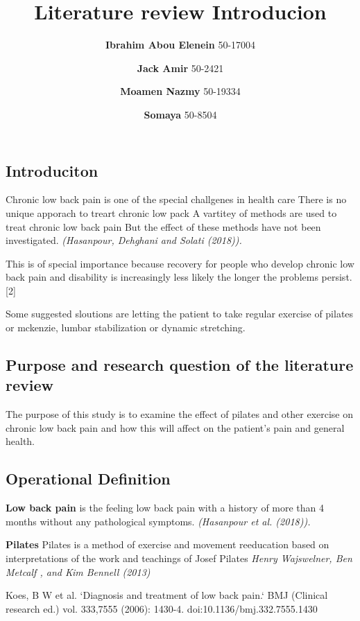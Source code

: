 \documentclass[a5paper]{article}
\theoremstyle{definition}
\begin{document}
\author{
    \textbf{Ibrahim Abou Elenein} 50-17004
  \and
    \textbf{Jack Amir} 50-2421
    \and
    \textbf{Moamen Nazmy} 50-19334
    \and
    \textbf{Somaya} 50-8504
}
\title{\textbf{Literature review Introducion}}
\maketitle
\subsection{Introduciton}
Chronic low back pain is one of the special challgenes in health care
There is no unique apporach to treart chronic low pack
A vartitey of methods are used to treat chronic low back pain
But the effect of these methods have not been investigated.
\textit{(Hasanpour, Dehghani and Solati (2018)).}

\par



\noindent
 This is of special importance because recovery for people who develop chronic
 low back pain and disability is increasingly less likely the longer the
 problems persist. [2]


\noindent
Some suggested sloutions are letting the patient to take regular exercise
of pilates or mckenzie, lumbar stabilization or dynamic stretching.

\subsection{Purpose and research question of the literature review}
The purpose of this study is to
examine the effect of pilates and other exercise on chronic low back pain
and how this will affect on the patient’s pain and general health.


\subsection{Operational Definition}

\textbf{Low back pain}
is the feeling low back pain with a history of more than 4 months
without any pathological symptoms.
\textit{(Hasanpour et al. (2018)).}

\noindent
\textbf{Pilates}
Pilates is a method of exercise and movement reeducation
based on interpretations of the work and teachings of Josef Pilates
\textit{Henry Wajswelner, Ben Metcalf , and Kim Bennell (2013)}



\begin{thebibliography}{10}
Koes, B W et al. `Diagnosis and treatment of low back pain.` BMJ (Clinical
research ed.) vol. 333,7555 (2006): 1430-4. doi:10.1136/bmj.332.7555.1430

\end{thebibliography}
\end{document}
